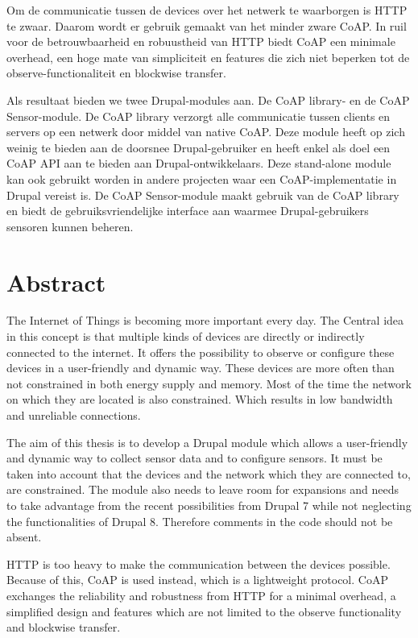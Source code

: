 {Om de communicatie tussen de devices over het netwerk te waarborgen is HTTP te zwaar. Daarom wordt er gebruik gemaakt van het minder zware CoAP. In ruil voor de betrouwbaarheid en robuustheid van HTTP biedt CoAP een minimale overhead, een hoge mate van simpliciteit en features die zich niet beperken tot de observe-functionaliteit en blockwise transfer.

Als resultaat bieden we twee Drupal-modules aan. De CoAP library- en de CoAP Sensor-module. De CoAP library verzorgt alle communicatie tussen clients en servers op een netwerk door middel van native CoAP. Deze module heeft op zich weinig te bieden aan de doorsnee Drupal-gebruiker en heeft enkel als doel een CoAP API aan te bieden aan Drupal-ontwikkelaars. Deze stand-alone module kan ook gebruikt worden in andere projecten waar een CoAP-implementatie in Drupal vereist is. De CoAP Sensor-module maakt gebruik van de CoAP library en biedt de gebruiksvriendelijke interface aan waarmee Drupal-gebruikers sensoren kunnen beheren.

\section*{Abstract}
The Internet of Things is becoming more important every day. The Central idea in this concept is that multiple kinds of devices are directly or indirectly connected to the internet. It offers the possibility to observe or configure these devices in a user-friendly and dynamic way. These devices are more often than not constrained in both energy supply and memory. Most of the time the network on which they are located is also constrained. Which results in low bandwidth and unreliable connections. 

The aim of this thesis is to develop a Drupal module which allows a user-friendly and dynamic way to collect sensor data and to configure sensors. It must be taken into account that the devices and the network which they are connected to, are constrained. The module also needs to leave room for expansions and needs to take advantage from the recent possibilities from Drupal 7 while not neglecting the functionalities of Drupal 8. Therefore comments in the code should not be absent. 

HTTP is too heavy to make the communication between the devices possible. Because of this, CoAP is used instead, which is a lightweight protocol. CoAP exchanges the reliability and robustness from HTTP for a minimal overhead, a simplified design and features which are not limited to the observe functionality and blockwise transfer.

}
